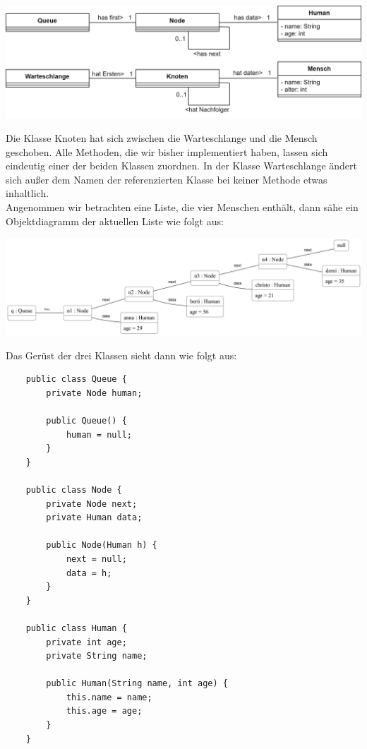 \documentclass{article}
\begin{document}
\begin{center}
    \includegraphics[scale = 0.2]{../media/linked_list_nodes_diagramm.png}
\end{center}
Die Klasse Knoten hat sich zwischen die Warteschlange und die  Mensch geschoben. Alle Methoden, die wir bisher implementiert haben, lassen sich eindeutig einer der beiden Klassen zuordnen. In der Klasse Warteschlange ändert sich außer dem Namen der referenzierten Klasse bei keiner Methode etwas inhaltlich. \\
Angenommen wir betrachten eine Liste, die vier Menschen enthält, dann sähe ein Objektdiagramm der aktuellen Liste wie folgt aus: \\
\begin{center}
    \includegraphics[scale = 0.14]{../media/linked_list_nodes_objectdiagram.png}
\end{center}
Das Gerüst der drei Klassen sieht dann wie folgt aus: 
\begin{verbatim}
    public class Queue {
        private Node human;

        public Queue() {
            human = null;
        }
    }

    public class Node {
        private Node next;
        private Human data;

        public Node(Human h) {
            next = null;
            data = h;
        }
    }

    public class Human {
        private int age;
        private String name;

        public Human(String name, int age) {
            this.name = name;
            this.age = age;
        }
    }
\end{verbatim}
\end{document}
